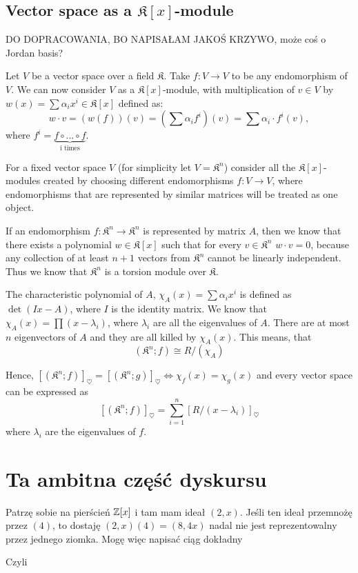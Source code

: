 {\color{red}
\subsection{Vector space as a $\mathfrak{K}[x]$-module}

{\large\color{cyan}DO DOPRACOWANIA, BO NAPISAŁAM JAKOŚ KRZYWO, może coś o Jordan basis?}

Let $V$ be a vector space over a field $\mathfrak{K}$. Take $f:V\to V$ to be any endomorphism of $V$. We can now consider $V$ as a $\mathfrak{K}[x]$-module, with multiplication of $v\in V$ by $w(x)=\sum \alpha_ix^i \in \mathfrak{K}[x]$ defined as:
$$w\cdot v=(w(f))(v)=(\sum \alpha_if^i)(v)=\sum \alpha_i\cdot f^i(v),$$
where $f^i=\underbrace{f\circ...\circ f}_{\text{i times}}$.

For a fixed vector space $V$ (for simplicity let $V=\mathfrak{K}^n$) consider all the $\mathfrak{K}[x]$-modules created by choosing different endomorphisms $f:V\to V$, where endomorphisms that are represented by similar matrices will be treated as one object. 

If an endomorphism $f:\mathfrak{K}^n\to\mathfrak{K}^n$ is represented by matrix $A$, then we know that there exists a polynomial $w\in\mathfrak{K}[x]$ such that for every $v\in\mathfrak{K}^n$ $w\cdot v=0$, because any collection of at least $n+1$ vectors from $\mathfrak{K}^n$ cannot be linearly independent. Thus we know that $\mathfrak{K}^n$ is a torsion module over $\mathfrak{K}$.

The characteristic polynomial of $A$, $\chi_A(x)=\sum \alpha_ix^i$ is defined as $\det(Ix-A)$, where $I$ is the identity matrix. We know that $\chi_A(x)=\prod (x-\lambda_i)$, where $\lambda_i$ are all the eigenvalues of $A$. There are at most $n$ eigenvectors of $A$ and they are all killed by $\chi_A(x)$. This means, that 
$$(\mathfrak{K}^n; f)\cong R/(\chi_A)$$

Hence, $[(\mathfrak{K}^n; f)]_\heartsuit=[(\mathfrak{K}^n; g)]_\heartsuit\iff \chi_f(x)=\chi_g(x)$ and every vector space can be expressed as
$$[(\mathfrak{K}^n;f)]_\heartsuit=\sum_{i=1}^n[R/(x-\lambda_i)]_\heartsuit$$
where $\lambda_i$ are the eigenvalues of $f$.
}

\section{Ta ambitna część dyskursu}

Patrzę sobie na pierścień $\operatorname{\mathbb{Z}}[x]$ i tam mam ideał $(2, x)$. Jeśli ten ideał przemnożę przez $(4)$, to dostaję $(2, x)(4)=(8, 4x)$ nadal nie jest reprezentowalny przez jednego ziomka. Mogę więc napisać ciąg dokładny
\begin{center}\end{center}
Czyli

